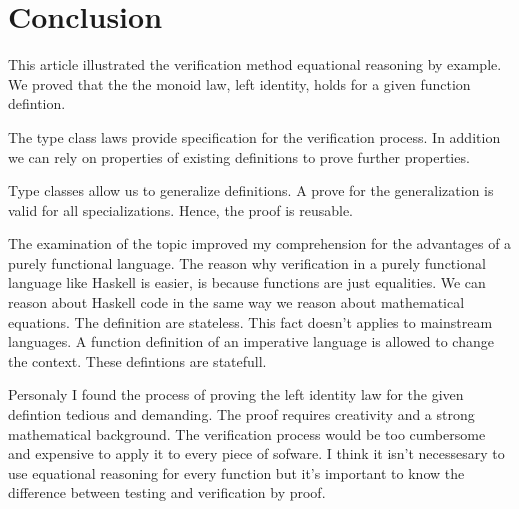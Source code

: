 
\section{Conclusion}

This article illustrated the verification method equational reasoning by example. We proved that the the monoid law, left identity, holds for a given function defintion. 

The type class laws provide specification for the verification process. In addition we can rely on properties of existing definitions to prove further properties.

Type classes allow us to generalize definitions. A prove for the generalization is valid for all specializations. Hence, the proof is reusable.

The examination of the topic improved my comprehension for the advantages of a purely functional language. The reason why verification in a purely functional language like Haskell is easier, is because functions are just equalities. We can reason about Haskell code in the same way we reason about mathematical equations. The definition are stateless. This fact doesn't applies to mainstream languages. A function definition of an imperative language is allowed to change the context. These defintions are statefull.

Personaly I found the process of proving the left identity law for the given defintion tedious and demanding. The proof requires creativity and a strong mathematical background. The verification process would be too cumbersome and expensive to apply it to every piece of sofware. I think it isn't necessesary to use equational reasoning for every function but it's important to know the difference between testing and verification by proof.
